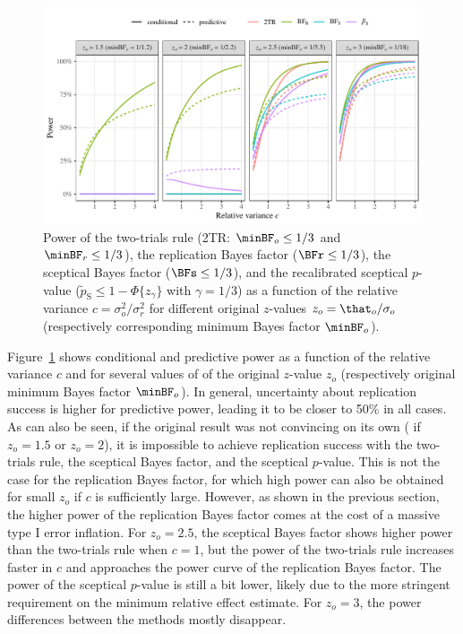 \begin{figure}
\begin{knitrout}
\color{fgcolor}
\includegraphics[width=\maxwidth]{images/paper2/power-plots-1}
\end{knitrout}
\caption{Power of the two-trials rule (2TR: $\minBF_{o} \leq 1/3$ and
  $\minBF_{r} \leq 1/3$), the replication Bayes factor ($\BFr \leq 1/3$), the
  sceptical Bayes factor ($\BFs \leq 1/3$), and the recalibrated sceptical
  $p$-value (\mbox{$\tilde{p}_{\mathrm{S}} \leq 1 - \Phi\{z_{\gamma}\}$} with
  $\gamma = 1/3$) as a function of the relative variance
  $c = \sigma^2_o/\sigma^2_r$ for different original $z$-values
  $z_o = \that_o/\sigma_o$ (respectively corresponding minimum Bayes factor
  $\minBF_o$).}
\label{fig2:condpower}
\end{figure}

Figure~\ref{fig2:condpower} shows conditional and predictive power as a function
of the relative variance $c$ and for several values of of the original $z$-value
$z_o$ (respectively original minimum Bayes factor $\minBF_{o}$). In general,
uncertainty about replication success is higher for predictive power, leading it
to be closer to 50\% in all cases. As can also be seen, if the original result
was not convincing on its own (\eg{} if $z_o = 1.5$ or $z_{o} = 2$), it is
impossible to achieve replication success with the two-trials rule, the
sceptical Bayes factor, and the sceptical $p$-value. This is not the case for
the replication Bayes factor, for which high power can also be obtained for
small $z_o$ if $c$ is sufficiently large. However, as shown in the previous
section, the higher power of the replication Bayes factor comes at the cost of a
massive type I error inflation. For $z_o = 2.5$, the sceptical Bayes factor
shows higher power than the two-trials rule when $c = 1$, but the power of the
two-trials rule increases faster in $c$ and approaches the power curve of the
replication Bayes factor. The power of the sceptical $p$-value is still a bit
lower, likely due to the more stringent requirement on the minimum relative
effect estimate. For $z_{o} = 3$, the power differences between the methods
mostly disappear.

